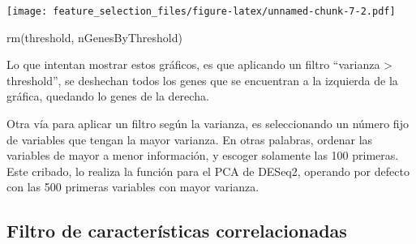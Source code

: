 \documentclass[
]{article}
\newenvironment{Shaded}{\begin{snugshade}}{\end{snugshade}}
\newcommand{\FunctionTok}[1]{\textcolor[rgb]{0.00,0.00,0.00}{#1}}
\newcommand{\NormalTok}[1]{#1}
\begin{document}
\texttt{[image: feature\_selection\_files/figure-latex/unnamed-chunk-7-2.pdf]}

\begin{Shaded}
\begin{Highlighting}[]
\FunctionTok{rm}\NormalTok{(threshold, nGenesByThreshold)}
\end{Highlighting}
\end{Shaded}

Lo que intentan mostrar estos gráficos, es que aplicando un filtro
``varianza \textgreater{} threshold'', se deshechan todos los genes que
se encuentran a la izquierda de la gráfica, quedando lo genes de la
derecha.

Otra vía para aplicar un filtro según la varianza, es seleccionando un
número fijo de variables que tengan la mayor varianza. En otras
palabras, ordenar las variables de mayor a menor información, y escoger
solamente las 100 primeras. Este cribado, lo realiza la función para el
PCA de DESeq2, operando por defecto con las 500 primeras variables con
mayor varianza.

\hypertarget{filtro-de-caracteruxedsticas-correlacionadas}{%
\subsection{Filtro de características
correlacionadas}\label{filtro-de-caracteruxedsticas-correlacionadas}}
\end{document}
